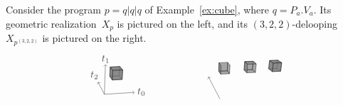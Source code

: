 \documentclass[orivec]{llncs} \usepackage[T1]{fontenc}
\newcommand{\nbd}{\nobreakdash-\hspace{0pt}}
\renewcommand{\P}[1]{P_{#1}}
\newcommand{\V}[1]{V_{#1}}
\begin{document}
\begin{example}
  \label{ex:delooping}
  Consider the program $p=q|q|q$ of Example~\ref{ex:cube}, where $q=\P a.\V
  a$. Its geometric realization~$X_p$ is pictured on the left, and its
  $(3,2,2)$\nbd{}delooping $X_{p^{(3,2,2)}}$ is pictured on the right.
  \vspace{-4ex}
  \[
\begin{tikzpicture}[line join=round,opacity=0.7]
\draw[arrows=->](.786,-.786)--(.561,-.354);
\filldraw[fill=gray](1.416,-.263)--(1.437,.072)--(1.333,.192)--(1.314,-.133)--cycle;
\filldraw[fill=gray](1.068,-.283)--(1.416,-.263)--(1.314,-.133)--(.978,-.151)--cycle;
\filldraw[fill=gray](.978,-.151)--(1.314,-.133)--(1.333,.192)--(.993,.175)--cycle;
\filldraw[fill=gray](1.068,-.283)--(1.084,.055)--(.993,.175)--(.978,-.151)--cycle;
\filldraw[fill=gray](1.084,.055)--(1.437,.072)--(1.333,.192)--(.993,.175)--cycle;
\filldraw[fill=gray](1.068,-.283)--(1.416,-.263)--(1.437,.072)--(1.084,.055)--cycle;
\draw[arrows=->](.786,-.786)--(1.855,-.718);
\draw[arrows=->](.786,-.786)--(.825,.267);
\draw (2.099,-.703) node {$t_0$};\draw (.832,.452) node {$t_1$};\draw (.435,-.115) node {$t_2$};\end{tikzpicture}   \qquad\qquad\qquad
  \begin{tikzpicture}[line join=round,opacity=0.7]
\draw[arrows=->](.786,-.786)--(.379,-.007);
\filldraw[fill=gray](2.517,.275)--(2.802,.288)--(2.838,.576)--(2.549,.564)--cycle;
\filldraw[fill=gray](2.647,.175)--(2.941,.19)--(2.802,.288)--(2.517,.275)--cycle;
\filldraw[fill=gray](2.941,.19)--(2.98,.487)--(2.838,.576)--(2.802,.288)--cycle;
\filldraw[fill=gray](2.647,.175)--(2.682,.473)--(2.549,.564)--(2.517,.275)--cycle;
\filldraw[fill=gray](2.682,.473)--(2.98,.487)--(2.838,.576)--(2.549,.564)--cycle;
\filldraw[fill=gray](2.05,.145)--(2.077,.446)--(1.963,.539)--(1.938,.247)--cycle;
\filldraw[fill=gray](1.746,.13)--(2.05,.145)--(1.938,.247)--(1.644,.233)--cycle;
\filldraw[fill=gray](1.644,.233)--(1.938,.247)--(1.963,.539)--(1.666,.526)--cycle;
\filldraw[fill=gray](1.746,.13)--(1.77,.432)--(1.666,.526)--(1.644,.233)--cycle;
\filldraw[fill=gray](1.77,.432)--(2.077,.446)--(1.963,.539)--(1.666,.526)--cycle;
\filldraw[fill=gray](1.131,.1)--(1.146,.404)--(1.062,.5)--(1.049,.204)--cycle;
\filldraw[fill=gray](.818,.084)--(1.131,.1)--(1.049,.204)--(.746,.19)--cycle;
\filldraw[fill=gray](.746,.19)--(1.049,.204)--(1.062,.5)--(.756,.487)--cycle;
\filldraw[fill=gray](2.647,.175)--(2.941,.19)--(2.98,.487)--(2.682,.473)--cycle;
\filldraw[fill=gray](.818,.084)--(.829,.39)--(.756,.487)--(.746,.19)--cycle;

\end{tikzpicture}\]
\end{example}
\end{document}

